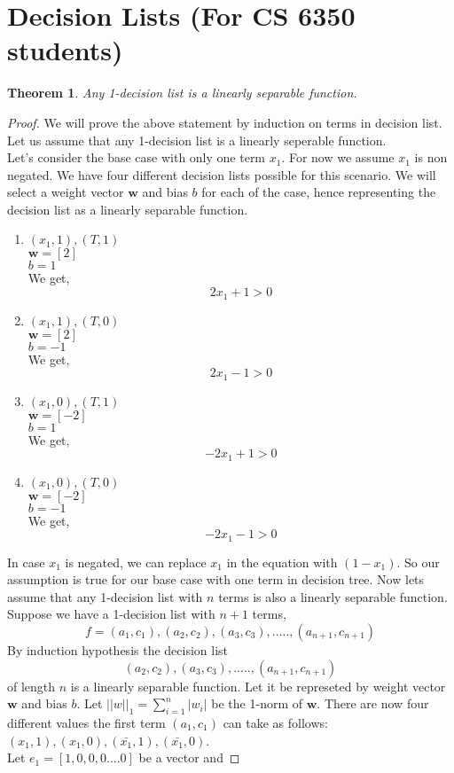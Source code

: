 \newpage
\section{Decision Lists (For CS 6350 students)}
\label{sec:decision-lists}

\newtheorem*{theorem}{Theorem}

\begin{theorem}
Any 1-decision list is a linearly separable function.
\end{theorem}

\begin{proof}
We will prove the above statement by induction on terms in decision list. Let us assume that any 1-decision list is a linearly seperable function.\\
Let's consider the base case with only one term $x_1$. For now we assume $x_1$ is non negated. We have four different decision lists possible for this scenario. We will select a weight vector $\boldsymbol w$ and bias $b$ for each of the case, hence representing the decision list as a linearly separable function.
\begin{enumerate}
\item $(x_1, 1), (T, 1)$\\
$\boldsymbol w = [2]$\\
$b = 1$\\
We get,
$$ 2x_1 + 1 > 0 $$

\item $(x_1, 1), (T, 0)$\\
$\boldsymbol w = [2]$\\
$b = -1$\\
We get,
$$ 2x_1 - 1 > 0 $$

\item $(x_1, 0), (T, 1)$\\
$\boldsymbol w = [-2]$\\
$b = 1$\\
We get,
$$ -2x_1 + 1 > 0 $$

\item $(x_1, 0), (T, 0)$\\
$\boldsymbol w = [-2]$\\
$b = -1$\\
We get,
$$ -2x_1 - 1 > 0 $$
\end{enumerate}

In case $x_1$ is negated, we can replace $x_1$ in the equation with $(1-x_1)$. So our assumption is true for our base case with one term in decision tree. 
Now lets assume that any 1-decision list with $n$ terms is also a linearly separable function. Suppose we have a 1-decision list with $n+1$ terms,
$$f = (a_1, c_1), (a_2,c_2), (a_3,c_3), ..... ,(a_{n+1}, c_{n+1})$$
By induction hypothesis the decision list
$$(a_2,c_2), (a_3,c_3), ..... ,(a_{n+1},c_{n+1})$$ of length $n$ is a linearly separable function. Let it be represeted by weight vector $\boldsymbol w$ and bias $b$. Let $||w||_1 = \sum_{i=1}^{n} |w_i|$ be the 1-norm of $\boldsymbol w$. There are now four different values the first term $(a_1, c_1)$ can take as follows: $(x_1, 1),(x_1, 0),(\bar{x_1}, 1),(\bar{x_1},0)$.\\
Let $e_1 = [1,0,0,0....0]$ be a vector and 


\end{proof}
